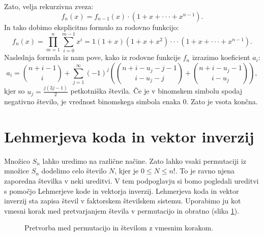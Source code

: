 \documentclass[a4paper, 12pt]{book}
\begin{document}
Zato, velja rekurzivna zveza:
\[
    f_n(x) = f_{n-1}(x) \cdot (1 + x + \cdot\cdot\cdot + x^{n-1}).
\]
In tako dobimo eksplicitno formulo za rodovno funkcijo:
\[
    f_n(x) = \prod_{m=1}^{n}\sum_{i=0}^{m-1} x^i = 1 (1 + x) (1 + x + x^2) \cdot\cdot\cdot (1 + x + \cdot\cdot\cdot + x^{n-1}).
\]
Naslednja formula iz \cite{generatingFunction} nam pove, kako iz rodovne funkcije $f_n$ izrazimo koeficient $a_i$:
\[
    a_i = \binom{n+i-1}{i} + \sum_{j=1}^{\infty} (-1)^j \left( \binom{n+i-u_j-j-1}{i-u_j-j} + \binom{n+i-u_j-1}{i-u_j} \right),
\]
kjer so $u_j = \frac{j(3j-1)}{2}$ petkotniška števila. Če je v binomskem simbolu spodaj negativno število, je vrednost binomskega simbola enaka $0$. Zato je vsota končna.

\section{ Lehmerjeva koda in vektor inverzij}
Množico $S_n$ lahko uredimo na različne načine. Zato lahko vsaki permutaciji iz množice $S_n$ dodelimo celo število $N$, kjer je $0 \leq N \leq n!$. To je ravno njena zaporedna številka v neki ureditvi. V tem podpoglavju si bomo pogledali ureditvi s pomočjo Lehmerjeve kode in vektorja inverzij. Lehmerjeva koda in vektor inverzij sta zapisa števil v faktorskem številskem sistemu. Uporabimo ju kot vmesni korak med pretvarjanjem števila v permutacijo in obratno (slika \ref{pretvarjanje_permutacija_stevilo}).
\begin{figure}[h]
    \begin{center}        
    \end{center}
    \caption{Pretvorba med permutacijo in številom z vmesnim korakom.}
    \label{pretvarjanje_permutacija_stevilo}
\end{figure}
\end{document}
